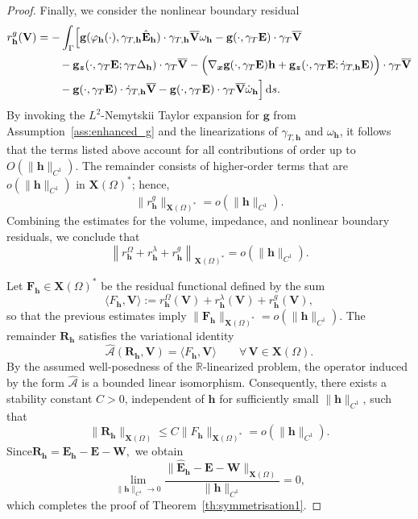 \documentclass[12pt,reqno]{amsart}
\theoremstyle{definition}
\numberwithin{equation}{section}
\begin{document}
\begin{proof}
Finally, we consider the nonlinear boundary residual
\[
\begin{aligned}
r_{\mathbf{h}}^{g}(\mathbf{V}) &= - \int_\Gamma \Bigl[ \mathbf{g}(\varphi_{\mathbf{h}}(\cdot), \gamma_{T,\mathbf{h}}\hat{\mathbf{E}}_{\mathbf{h}}) \cdot \gamma_{T,\mathbf{h}}\overline{\mathbf{V}} \omega_{\mathbf{h}} - \mathbf{g}(\cdot,\gamma_T\mathbf{E}) \cdot \gamma_T\overline{\mathbf{V}} \\
&\qquad - \mathbf{g}_{\boldsymbol{z}}(\cdot,\gamma_T\mathbf{E};\gamma_T\Delta_{\mathbf{h}}) \cdot \gamma_T\overline{\mathbf{V}} - \Bigl( \nabla_{\boldsymbol{x}}\mathbf{g}(\cdot,\gamma_T\mathbf{E})\mathbf{h} + \mathbf{g}_{\boldsymbol{z}}(\cdot,\gamma_T\mathbf{E}; \dot{\gamma}_{T,\mathbf{h}}\mathbf{E}) \Bigr) \cdot \gamma_T\overline{\mathbf{V}} \\
&\qquad - \mathbf{g}(\cdot,\gamma_T\mathbf{E}) \cdot \dot{\gamma}_{T,\mathbf{h}}\overline{\mathbf{V}} - \mathbf{g}(\cdot,\gamma_T\mathbf{E}) \cdot \gamma_T\overline{\mathbf{V}} \dot{\omega}_{\mathbf{h}} \Bigr] \,\mathrm{d}s.
\end{aligned}
\]
By invoking the $L^2$-Nemytskii Taylor expansion for $\mathbf{g}$ from Assumption~\ref{ass:enhanced_g} and the linearizations of $\gamma_{T,\mathbf{h}}$ and $\omega_{\mathbf{h}}$, it follows that the terms listed above account for all contributions of order up to $O(\|\mathbf{h}\|_{C^1})$. The remainder consists of higher-order terms that are $o(\|\mathbf{h}\|_{C^1})$ in $\mathbf{X}(\Omega)^*$; hence,
\[
\|r_{\mathbf{h}}^{g}\|_{\mathbf{X}(\Omega)^*} = o(\|\mathbf{h}\|_{C^1}).
\]
Combining the estimates for the volume, impedance, and nonlinear boundary residuals, we conclude that
\[
\left\| r_{\mathbf{h}}^{\Omega} + r_{\mathbf{h}}^{\lambda} + r_{\mathbf{h}}^{g} \right\|_{\mathbf{X}(\Omega)^*} = o(\|\mathbf{h}\|_{C^1}).
\]


Let $\mathbf{F}_{\mathbf{h}} \in \mathbf{X}(\Omega)^*$ be the residual functional defined by the sum
\[
\langle {F}_{\mathbf{h}}, \mathbf{V} \rangle := r_{\mathbf{h}}^{\Omega}(\mathbf{V}) + r_{\mathbf{h}}^{\lambda}(\mathbf{V}) + r_{\mathbf{h}}^{g}(\mathbf{V}),
\]
so that the previous estimates imply $\|\mathbf{F}_{\mathbf{h}}\|_{\mathbf{X}(\Omega)^*} = o(\|\mathbf{h}\|_{C^1})$. The remainder $\mathbf{R}_{\mathbf{h}}$ satisfies the variational identity
\[
\widehat{\mathcal{A}}(\mathbf{R}_{\mathbf{h}}, \mathbf{V}) = \langle {F}_{\mathbf{h}}, \mathbf{V} \rangle \qquad \forall \, \mathbf{V} \in \mathbf{X}(\Omega).
\]
By the assumed well-posedness of the $\mathbb{R}$-linearized problem, the operator induced by the form $\widehat{\mathcal{A}}$ is a bounded linear isomorphism. Consequently, there exists a stability constant $C > 0$, independent of $\mathbf{h}$ for sufficiently small $\|\mathbf{h}\|_{C^1}$, such that
\[
\|\mathbf{R}_{\mathbf{h}}\|_{\mathbf{X}(\Omega)} \le C \|{F}_{\mathbf{h}}\|_{\mathbf{X}(\Omega)^*} = o(\|\mathbf{h}\|_{C^1}).
\]
Since$
\mathbf R_{\mathbf h}
=\hat{\mathbf E}_{\mathbf h}-\mathbf E-\mathbf W,
$
we obtain
\[
\lim_{\|\mathbf h\|_{C^1}\to0}
\frac{\|\hat{\mathbf E}_{\mathbf h}-\mathbf E-\mathbf W\|_{\mathbf X(\Omega)}
}{\|\mathbf h\|_{C^1}}=0,
\]
which completes the proof of Theorem~\ref{th:symmetrisation1}.
\end{proof}
\end{document}
